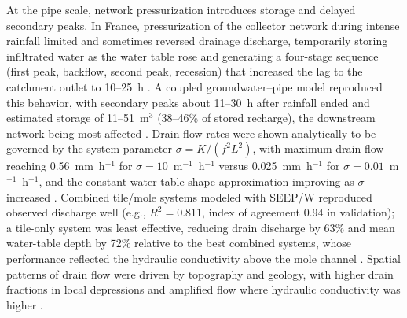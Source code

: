 \documentclass[11pt]{article}
\begin{document}
At the pipe scale, network pressurization introduces storage and delayed secondary peaks. In France, pressurization of the collector network during intense rainfall limited and sometimes reversed drainage discharge, temporarily storing infiltrated water as the water table rose and generating a four-stage sequence (first peak, backflow, second peak, recession) that increased the lag to the catchment outlet to 10--25~h \parencite{Henine2010}. A coupled groundwater--pipe model reproduced this behavior, with secondary peaks about 11--30~h after rainfall ended and estimated storage of 11--51~m$^3$ (38--46\% of stored recharge), the downstream network being most affected \parencite{Henine2014}. Drain flow rates were shown analytically to be governed by the system parameter $\sigma = K/(f^2 L^2)$, with maximum drain flow reaching 0.56~mm~h$^{-1}$ for $\sigma=10$~m$^{-1}$~h$^{-1}$ versus 0.025~mm~h$^{-1}$ for $\sigma=0.01$~m$^{-1}$~h$^{-1}$, and the constant-water-table-shape approximation improving as $\sigma$ increased \parencite{Bouarfa2000}. Combined tile/mole systems modeled with SEEP/W reproduced observed discharge well (e.g., $R^2=0.811$, index of agreement 0.94 in validation); a tile-only system was least effective, reducing drain discharge by 63\% and mean water-table depth by 72\% relative to the best combined systems, whose performance reflected the hydraulic conductivity above the mole channel \parencite{Tuohy2018}. Spatial patterns of drain flow were driven by topography and geology, with higher drain fractions in local depressions and amplified flow where hydraulic conductivity was higher \parencite{Mahmood2023}.
\end{document}
